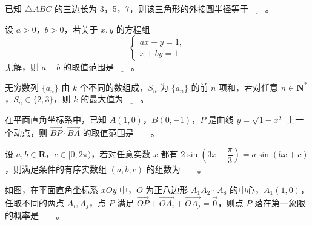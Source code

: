 \begin{question}
已知 \(\triangle ABC\) 的三边长为 3，5，7，则该三角形的外接圆半径等于\(\underline{\qquad}\)。

\end{question}
\begin{question}
设 \(a>0\)，\(b>0\)，若关于 \(x,y\) 的方程组
\nopagebreak[4]
\[
\begin{cases}
ax+y=1,\\
x+by=1
\end{cases}
\]
无解，则 \(a+b\) 的取值范围是\(\underline{\qquad}\)。

\end{question}
\begin{question}
无穷数列 \(\{a_n\}\) 由 \(k\) 个不同的数组成，\(S_n\) 为 \(\{a_n\}\) 的前 \(n\) 项和，若对任意 \(n\in\mathbf{N}^*\)，\(S_n\in\{2,3\}\)，则 \(k\) 的最大值为\(\underline{\qquad}\)。

\end{question}
\begin{question}
在平面直角坐标系中，已知 \(A(1,0)\)，\(B(0,-1)\)，\(P\) 是曲线 \(y=\sqrt{1-x^2}\) 上一个动点，则 \(\overrightarrow{BP}\cdot\overrightarrow{BA}\) 的取值范围是\(\underline{\qquad}\)。

\end{question}
\begin{question}
设 \(a,b\in\mathbf{R}\)，\(c\in[0,2\pi)\)，若对任意实数 \(x\) 都有 \(2\sin\left(3x-\dfrac{\pi}{3}\right)=a\sin(bx+c)\)，则满足条件的有序实数组 \((a,b,c)\) 的组数为\(\underline{\qquad}\)。

\Needspace{0.4\textheight}
\end{question}
\begin{question}
如图，在平面直角坐标系 \(xOy\) 中，\(O\) 为正八边形 \(A_1A_2\cdots A_8\) 的中心，\(A_1(1,0)\)，任取不同的两点 \(A_i,A_j\)，点 \(P\) 满足 \(\overrightarrow{OP}+\overrightarrow{OA_i}+\overrightarrow{OA_j}=\vec{0}\)，则点 \(P\) 落在第一象限的概率是\(\underline{\qquad}\)。
\nopagebreak[4]
\begin{center}\end{center}
\nopagebreak[4]
\end{question}

